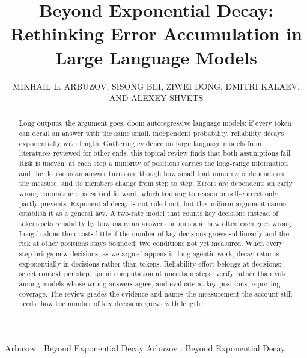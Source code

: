 \documentclass{ieeeaccess}
\begin{document}

\title{Beyond Exponential Decay: Rethinking Error Accumulation in Large Language Models}

\author{\uppercase{Mikhail L. Arbuzov},
\uppercase{Sisong Bei},
\uppercase{Ziwei Dong},
\uppercase{Dmitri Kalaev},
AND \uppercase{Alexey Shvets}}

\address[1]{Independent Researcher, CITY, COUNTRY (e-mail: mike.arbuzov54@gmail.com)}
\address[2]{Independent Researcher, CITY, COUNTRY (e-mail: qurining@gmail.com)}
\address[3]{Independent Researcher, CITY, COUNTRY (e-mail: ziwei.dong@alumni.emory.edu)}
\address[4]{Independent Researcher, CITY, COUNTRY (e-mail: kalaevdr@gmail.com)}
\address[5]{Palo Alto Networks, CITY, COUNTRY (e-mail: ashvets@paloaltonetworks.com)}

\markboth
{Arbuzov \headeretal: Beyond Exponential Decay}
{Arbuzov \headeretal: Beyond Exponential Decay}


\begin{abstract}
Long outputs, the argument goes, doom autoregressive language models: if every token can derail an answer with the same small, independent probability, reliability decays exponentially with length. Gathering evidence on large language models from literatures reviewed for other ends, this topical review finds that both assumptions fail. Risk is uneven: at each step a minority of positions carries the long-range information and the decisions an answer turns on, though how small that minority is depends on the measure, and its members change from step to step. Errors are dependent: an early wrong commitment is carried forward, which training to reason or self-correct only partly prevents. Exponential decay is not ruled out, but the uniform argument cannot establish it as a general law. A two-rate model that counts key decisions instead of tokens sets reliability by how many an answer contains and how often each goes wrong. Length alone then costs little if the number of key decisions grows sublinearly and the risk at other positions stays bounded, two conditions not yet measured. When every step brings new decisions, as we argue happens in long agentic work, decay returns exponentially in decisions rather than tokens. Reliability effort belongs at decisions: select context per step, spend computation at uncertain steps, verify rather than vote among models whose wrong answers agree, and evaluate at key positions, reporting coverage. The review grades the evidence and names the measurement the account still needs: how the number of key decisions grows with length.
\end{abstract}
\end{document}
